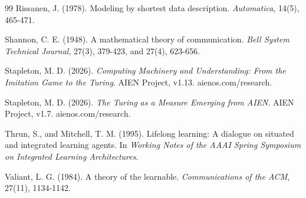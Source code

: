 \documentclass[11pt]{article}
\begin{document}
\begin{thebibliography}{99}
 Rissanen, J. (1978). Modeling by shortest data description. \emph{Automatica}, 14(5), 465-471.

 Shannon, C. E. (1948). A mathematical theory of communication. \emph{Bell System Technical Journal}, 27(3), 379-423, and 27(4), 623-656.

 Stapleton, M. D. (2026). \emph{Computing Machinery and Understanding: From the Imitation Game to the Turing}. AIEN Project, v1.13. aienos.com/research.

 Stapleton, M. D. (2026). \emph{The Turing as a Measure Emerging from AIEN}. AIEN Project, v1.7. aienos.com/research.

 Thrun, S., and Mitchell, T. M. (1995). Lifelong learning: A dialogue on situated and integrated learning agents. In \emph{Working Notes of the AAAI Spring Symposium on Integrated Learning Architectures}.

 Valiant, L. G. (1984). A theory of the learnable. \emph{Communications of the ACM}, 27(11), 1134-1142.

\end{thebibliography}
\end{document}
